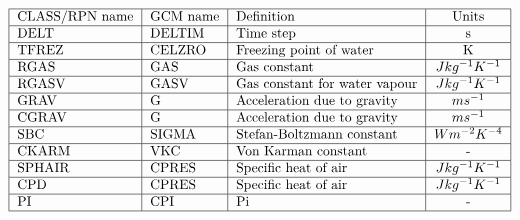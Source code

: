 \[ \begin{tabular} { | l | l | l | c | } \hline CLASS/RPN name & GCM name & Definition & Units \\ \hline DELT & DELTIM & Time step & s \\ \hline TFREZ & CELZRO & Freezing point of water & K \\ \hline RGAS & GAS & Gas constant & $J kg^{-1} K^{-1}$ \\ \hline RGASV & GASV & Gas constant for water vapour & $J kg^{-1} K^{-1}$ \\ \hline GRAV & G & Acceleration due to gravity & $m s^{-1} $ \\ \hline CGRAV & G & Acceleration due to gravity & $m s^{-1} $ \\ \hline SBC & SIGMA & Stefan-Boltzmann constant & $W m^{-2} K^{-4} $ \\ \hline CKARM & VKC & Von Karman constant & - \\ \hline SPHAIR & CPRES & Specific heat of air & $J kg^{-1} K^{-1}$ \\ \hline CPD & CPRES & Specific heat of air & $J kg^{-1} K^{-1}$ \\ \hline PI & CPI & Pi & - \\ \hline \end{tabular} \] 